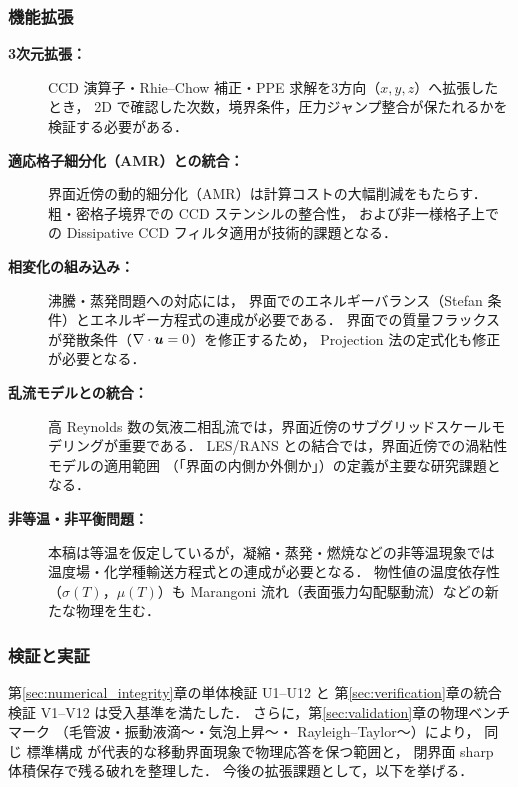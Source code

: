 \subsubsection{機能拡張}

\begin{description}
  \item[\textbf{3次元拡張：}]
        CCD 演算子・Rhie--Chow 補正・PPE 求解を3方向（$x,y,z$）へ拡張したとき，
        2D で確認した次数，境界条件，圧力ジャンプ整合が保たれるかを検証する必要がある．

  \item[\textbf{適応格子細分化（AMR）との統合：}]
        界面近傍の動的細分化（AMR）は計算コストの大幅削減をもたらす．
        粗・密格子境界での CCD ステンシルの整合性，
        および非一様格子上での Dissipative CCD フィルタ適用が技術的課題となる．

  \item[\textbf{相変化の組み込み：}]
        沸騰・蒸発問題への対応には，
        界面でのエネルギーバランス（Stefan 条件）とエネルギー方程式の連成が必要である．
        界面での質量フラックスが発散条件（$\nabla\cdot\bm{u} = 0$）を修正するため，
        Projection 法の定式化も修正が必要となる．

  \item[\textbf{乱流モデルとの統合：}]
        高 Reynolds 数の気液二相乱流では，界面近傍のサブグリッドスケールモデリングが重要である．
        LES/RANS との結合では，界面近傍での渦粘性モデルの適用範囲
        （「界面の内側か外側か」）の定義が主要な研究課題となる．

  \item[\textbf{非等温・非平衡問題：}]
        本稿は等温を仮定しているが，凝縮・蒸発・燃焼などの非等温現象では
        温度場・化学種輸送方程式との連成が必要となる．
        物性値の温度依存性（$\sigma(T)$，$\mu(T)$）も
        Marangoni 流れ（表面張力勾配駆動流）などの新たな物理を生む．
\end{description}

\subsubsection{検証と実証}

第\ref{sec:numerical_integrity}章の単体検証 U1--U12 と
第\ref{sec:verification}章の統合検証 V1--V12 は受入基準を満たした．
さらに，第\ref{sec:validation}章の物理ベンチマーク
（毛管波・振動液滴～\cite{Prosperetti1981}・気泡上昇～\cite{Hysing2009}・
Rayleigh--Taylor～\cite{Chandrasekhar1961,Tryggvason1988}）により，
同じ 標準構成 が代表的な移動界面現象で物理応答を保つ範囲と，
閉界面 sharp 体積保存で残る破れを整理した．
今後の拡張課題として，以下を挙げる．

